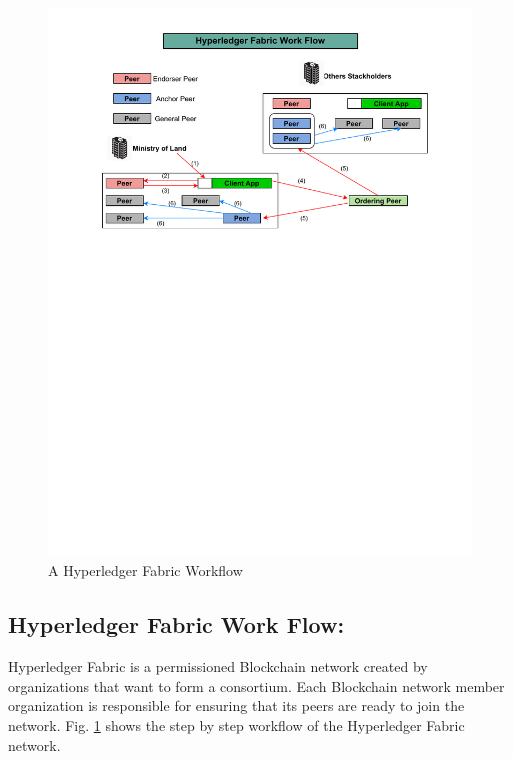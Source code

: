 \documentclass[12pt]{ucthesis}
\begin{document}
 \begin{figure}[!t]
 \centering
\includegraphics[width=15cm,scale=0.6]{./img/fig04380.pdf}
\caption{A Hyperledger Fabric Workflow}
\label{fig4}
\end{figure}
\vspace{-2mm}

\subsection{Hyperledger  Fabric  Work  Flow:}
Hyperledger Fabric is a permissioned Blockchain network created by organizations that want to form a consortium. Each Blockchain network member organization is responsible for ensuring that its peers are ready to join the network. Fig. \ref{fig4}  shows the step by step workflow of the Hyperledger Fabric network.
\end{document}
